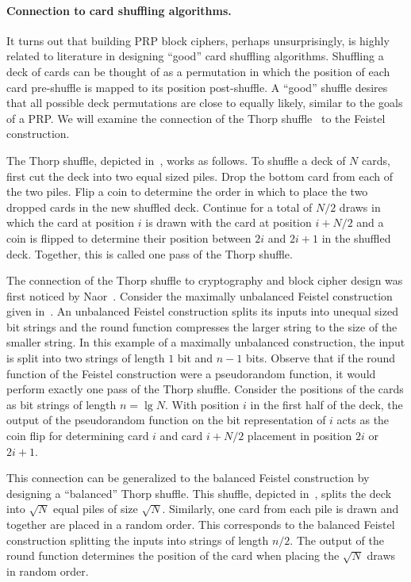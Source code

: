 \paragraph{Connection to card shuffling algorithms.}
It turns out that building PRP block ciphers, perhaps unsurprisingly, is highly related to literature in designing ``good'' card shuffling algorithms.
Shuffling a deck of cards can be thought of as a permutation in which the position of each card pre-shuffle is mapped to its position post-shuffle.
A ``good'' shuffle desires that all possible deck permutations are close to equally likely, similar to the goals of a PRP.
We will examine the connection of the Thorp shuffle~\cite{Thorp73} to the Feistel construction.

The Thorp shuffle, depicted in~, works as follows.
To shuffle a deck of $N$ cards, first cut the deck into two equal sized piles.
Drop the bottom card from each of the two piles.
Flip a coin to determine the order in which to place the two dropped cards in the new shuffled deck.
Continue for a total of $N/2$ draws in which the card at position $i$ is drawn with the card at position $i+N/2$ and a coin is flipped to determine their position between $2i$ and $2i+1$ in the shuffled deck.
Together, this is called one pass of the Thorp shuffle.

The connection of the Thorp shuffle to cryptography and block cipher design was first noticed by Naor~\cite{NaorReingold99}.
Consider the maximally unbalanced Feistel construction given in~.
An unbalanced Feistel construction splits its inputs into unequal sized bit strings and the round function compresses the larger string to the size of the smaller string.
In this example of a maximally unbalanced construction, the input is split into two strings of length $1$ bit and $n-1$ bits.
Observe that if the round function of the Feistel construction were a pseudorandom function, it would perform exactly one pass of the Thorp shuffle.
Consider the positions of the cards as bit strings of length $n = \lg N$.
With position $i$ in the first half of the deck, the output of the pseudorandom function on the bit representation of $i$ acts as the coin flip for determining card $i$ and card $i + N/2$ placement in position $2i$ or $2i+1$.

This connection can be generalized to the balanced Feistel construction by designing a ``balanced'' Thorp shuffle.
This shuffle, depicted in~, splits the deck into $\sqrt{N}$ equal piles of size $\sqrt{N}$.
Similarly, one card from each pile is drawn and together are placed in a random order.
This corresponds to the balanced Feistel construction splitting the inputs into strings of length $n/2$.
The output of the round function determines the position of the card when placing the $\sqrt{N}$ draws in random order.

